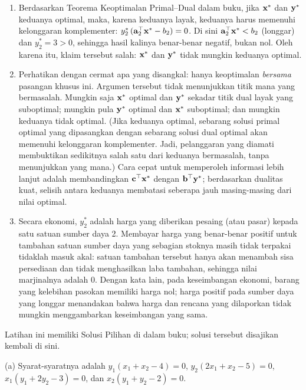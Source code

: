 \begin{enumerate}
\item Berdasarkan Teorema Keoptimalan Primal--Dual dalam buku, jika $\mathbf{x}^*$ dan $\mathbf{y}^*$ keduanya optimal, maka, karena keduanya layak, keduanya harus memenuhi kelonggaran komplementer: $y_2^*\,(\mathbf{a}_2^\top\mathbf{x}^* - b_2) = 0$. Di sini $\mathbf{a}_2^\top\mathbf{x}^* < b_2$ (longgar) dan $y_2^* = 3 > 0$, sehingga hasil kalinya benar-benar negatif, bukan nol. Oleh karena itu, klaim tersebut salah: $\mathbf{x}^*$ dan $\mathbf{y}^*$ tidak mungkin keduanya optimal.
\item Perhatikan dengan cermat apa yang disangkal: hanya keoptimalan \emph{bersama} pasangan khusus ini. Argumen tersebut tidak menunjukkan titik mana yang bermasalah. Mungkin saja $\mathbf{x}^*$ optimal dan $\mathbf{y}^*$ sekadar titik dual layak yang suboptimal; mungkin pula $\mathbf{y}^*$ optimal dan $\mathbf{x}^*$ suboptimal; dan mungkin keduanya tidak optimal. (Jika keduanya optimal, sebarang solusi primal optimal yang dipasangkan dengan sebarang solusi dual optimal akan memenuhi kelonggaran komplementer. Jadi, pelanggaran yang diamati membuktikan sedikitnya salah satu dari keduanya bermasalah, tanpa menunjukkan yang mana.) Cara cepat untuk memperoleh informasi lebih lanjut adalah membandingkan $\mathbf{c}^\top\mathbf{x}^*$ dengan $\mathbf{b}^\top\mathbf{y}^*$; berdasarkan dualitas kuat, selisih antara keduanya membatasi seberapa jauh masing-masing dari nilai optimal.
\item Secara ekonomi, $y_2^*$ adalah harga yang diberikan pesaing (atau pasar) kepada satu satuan sumber daya 2. Membayar harga yang benar-benar positif untuk tambahan satuan sumber daya yang sebagian stoknya masih tidak terpakai tidaklah masuk akal: satuan tambahan tersebut hanya akan menambah sisa persediaan dan tidak menghasilkan laba tambahan, sehingga nilai marjinalnya adalah $0$. Dengan kata lain, pada keseimbangan ekonomi, barang yang kelebihan pasokan memiliki harga nol; harga positif pada sumber daya yang longgar menandakan bahwa harga dan rencana yang dilaporkan tidak mungkin menggambarkan keseimbangan yang sama.
\end{enumerate}


Latihan ini memiliki Solusi Pilihan di dalam buku; solusi tersebut disajikan kembali di sini.

(a) Syarat-syaratnya adalah $y_1(x_1 + x_2 - 4) = 0$, $y_2(2x_1 + x_2 - 5) = 0$, $x_1(y_1 + 2y_2 - 3) = 0$, dan $x_2(y_1 + y_2 - 2) = 0$.

